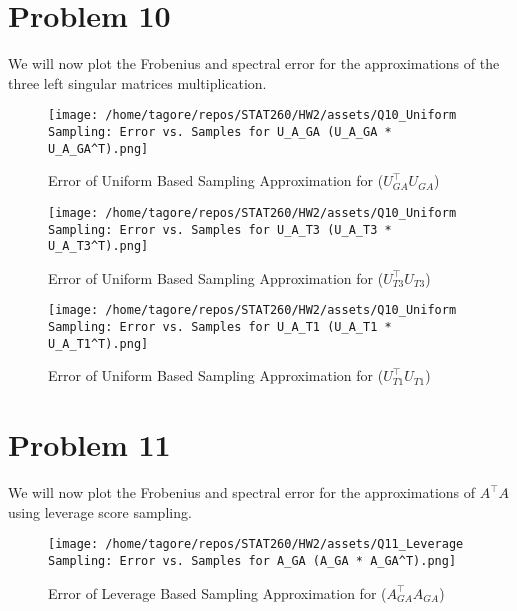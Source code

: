 \documentclass{article}
\begin{document}
\newpage

\section*{Problem 10}

We will now plot the Frobenius and spectral error for the approximations of the three left singular matrices multiplication.

\begin{figure}[H]
    \centering
    \texttt{[image: /home/tagore/repos/STAT260/HW2/assets/Q10\_Uniform Sampling: Error vs. Samples for U\_A\_GA (U\_A\_GA * U\_A\_GA^T).png]}
    \caption{Error of Uniform Based Sampling Approximation for (\(U_{GA}^\top U_{GA}\))}
    \label{fig:GA_uniform_based_error}
\end{figure}

\begin{figure}[H]
    \centering
    \texttt{[image: /home/tagore/repos/STAT260/HW2/assets/Q10\_Uniform Sampling: Error vs. Samples for U\_A\_T3 (U\_A\_T3 * U\_A\_T3^T).png]}
    \caption{Error of Uniform Based Sampling Approximation for (\(U_{T3}^\top U_{T3}\))}
    \label{fig:T1_uniform_based_error}
\end{figure}

\begin{figure}[H]
    \centering
    \texttt{[image: /home/tagore/repos/STAT260/HW2/assets/Q10\_Uniform Sampling: Error vs. Samples for U\_A\_T1 (U\_A\_T1 * U\_A\_T1^T).png]}
    \caption{Error of Uniform Based Sampling Approximation for (\(U_{T1}^\top U_{T1}\))}
    \label{fig:T3_uniform_based_error}
\end{figure}

\newpage

\section*{Problem 11}

We will now plot the Frobenius and spectral error for the approximations of \(A^\top A\) using leverage score sampling.

\begin{figure}[H]
    \centering
    \texttt{[image: /home/tagore/repos/STAT260/HW2/assets/Q11\_Leverage Sampling: Error vs. Samples for A\_GA (A\_GA * A\_GA^T).png]}
    \caption{Error of Leverage Based Sampling Approximation for (\(A_{GA}^\top A_{GA}\))}
    \label{fig:GA_leverage_based_error}
\end{figure}
\end{document}
